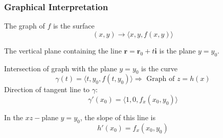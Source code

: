 \begin{frame}
\frametitle{Graphical Interpretation}

The graph of $f$ is the surface
%
$$(x,y) \to  \langle x,y, f(x,y) \rangle$$

The vertical plane containing the line $\textbf{r}=\textbf{r}_0 + t\textbf{i}$ is the plane $y=y_0$.

Intersection of graph with the plane $y=y_0$ is the curve
%
$$\gamma(t) = \langle t, y_0, f(t,y_0) \rangle \Longrightarrow \text{ Graph of } z=h(x)$$
%
Direction of tangent line to $\gamma$:
%
$$\gamma'(x_0) = \langle 1,0,f_x(x_0,y_0) \rangle$$

In the $xz-$plane $y=y_0$, the slope of this line is
%
$$h'(x_0) = f_x(x_0,y_0)$$
\end{frame}
